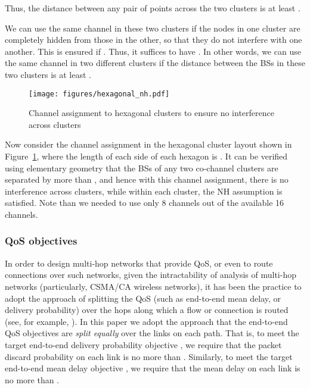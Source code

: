 \documentclass[12pt, draftclsnofoot, onecolumn]{IEEEtran}
\begin{document}
Thus, the distance between any pair of points across the two clusters is at least .

We can use the same channel in these two clusters if the nodes in one cluster are completely hidden from those in the other, so that they do not interfere with one another. This is ensured if . Thus, it suffices to have . In other words, we can use the same channel in two different clusters if the distance between the BSs in these two clusters is at least .

\begin{figure}[h]
\begin{center}
\texttt{[image: figures/hexagonal\_nh.pdf]}
\caption{Channel assignment to hexagonal clusters to ensure no interference across clusters}
\label{fig:hexagonal_nh}
\vspace{-5mm}
\end{center}
\end{figure}
Now consider the channel assignment in the hexagonal cluster layout shown in Figure~\ref{fig:hexagonal_nh}, where the length of each side of each hexagon is . It can be verified using elementary geometry that the BSs of any two co-channel clusters are separated by more than , and hence with this channel assignment, there is no interference across clusters, while within each cluster, the NH assumption is satisfied. Note than we needed to use only 8 channels out of the available 16 channels. 

\subsubsection{QoS objectives}
\label{subsubsec:qos}

In order to design multi-hop networks that provide QoS, or even to route connections over such networks, given the intractability of analysis of multi-hop networks (particularly, CSMA/CA wireless networks), it has been the practice to adopt the approach of splitting the QoS (such as end-to-end mean delay, or delivery probability) over the hops along which a flow or connection is routed (see, for example, \cite[Section~5.10.1]{kmk1}). In this paper we adopt the approach that the end-to-end QoS objectives are \emph{split equally} over the links on each path. That is, to meet the target end-to-end delivery probability objective , we require that the packet discard probability on each link is no more than . Similarly, to meet the target end-to-end mean delay objective , we require that the mean delay on each link is no more than .
\end{document}
